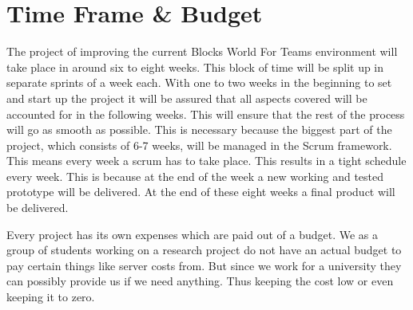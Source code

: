 \documentclass[a4paper]{article}
\begin{document}
\section{Time Frame \& Budget}
The project of improving the current Blocks World For Teams environment will take place in around six to eight weeks. This block of time will be split up in separate sprints of a week each. With one to two weeks in the beginning to set and start up the project it will be assured that all aspects covered will be accounted for in the following weeks. This will ensure that the rest of the process will go as smooth as possible. This is necessary because the biggest part of the project, which consists of 6-7 weeks, will be managed in the Scrum framework. This means every week a scrum has to take place. This results in a tight schedule every week. This is because at the end of the week a new working and tested prototype will be delivered. At the end of these eight weeks a final product will be delivered.

Every project has its own expenses which are paid out of a budget. We as a group of students working on a research project do not have an actual budget to pay certain things like server costs from. But since we work for a university they can possibly provide us if we need anything. Thus keeping the cost low or even keeping it to zero.


\clearpage


\end{document}
